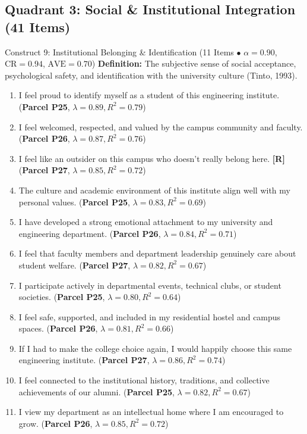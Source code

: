 \documentclass[10pt,a4paper]{article}
\begin{document}
\newpage
\subsection{Quadrant 3: Social \& Institutional Integration (41 Items)}

\begin{constructbox}{Construct 9: Institutional Belonging \& Identification (11 Items $\bullet$ $\alpha = 0.90$, $\text{CR} = 0.94$, $\text{AVE} = 0.70$)}
\textbf{Definition:} The subjective sense of social acceptance, psychological safety, and identification with the university culture (Tinto, 1993).
\begin{enumerate}[label=\textbf{Q\arabic*.}, leftmargin=2.5em, itemsep=2pt, resume]
  \item I feel proud to identify myself as a student of this engineering institute. \hfill (\textbf{Parcel P25}, $\lambda = 0.89, R^2 = 0.79$)
  \item I feel welcomed, respected, and valued by the campus community and faculty. \hfill (\textbf{Parcel P26}, $\lambda = 0.87, R^2 = 0.76$)
  \item I feel like an outsider on this campus who doesn't really belong here. \textbf{[R]} \hfill (\textbf{Parcel P27}, $\lambda = 0.85, R^2 = 0.72$)
  \item The culture and academic environment of this institute align well with my personal values. \hfill (\textbf{Parcel P25}, $\lambda = 0.83, R^2 = 0.69$)
  \item I have developed a strong emotional attachment to my university and engineering department. \hfill (\textbf{Parcel P26}, $\lambda = 0.84, R^2 = 0.71$)
  \item I feel that faculty members and department leadership genuinely care about student welfare. \hfill (\textbf{Parcel P27}, $\lambda = 0.82, R^2 = 0.67$)
  \item I participate actively in departmental events, technical clubs, or student societies. \hfill (\textbf{Parcel P25}, $\lambda = 0.80, R^2 = 0.64$)
  \item I feel safe, supported, and included in my residential hostel and campus spaces. \hfill (\textbf{Parcel P26}, $\lambda = 0.81, R^2 = 0.66$)
  \item If I had to make the college choice again, I would happily choose this same engineering institute. \hfill (\textbf{Parcel P27}, $\lambda = 0.86, R^2 = 0.74$)
  \item I feel connected to the institutional history, traditions, and collective achievements of our alumni. \hfill (\textbf{Parcel P25}, $\lambda = 0.82, R^2 = 0.67$)
  \item I view my department as an intellectual home where I am encouraged to grow. \hfill (\textbf{Parcel P26}, $\lambda = 0.85, R^2 = 0.72$)
\end{enumerate}
\end{constructbox}
\end{document}

